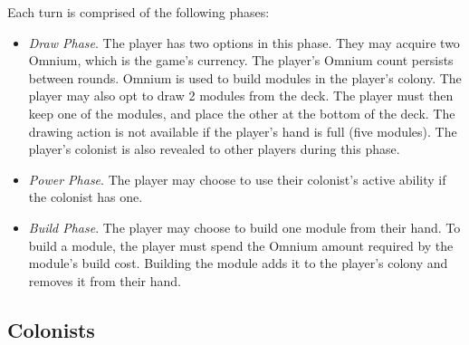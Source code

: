 Each turn is comprised of the following phases:
\begin{itemize}
    \item \emph{Draw Phase}. The player has two options in this phase.
        They may acquire two Omnium, which is the game's currency. The player's
        Omnium count persists between rounds. Omnium is used to build modules in
        the player's colony.
        The player may also opt to draw 2 modules from the deck. The player
        must then keep one of the modules, and place the other at the bottom of the deck.
        The drawing action is not available if the player's hand is full (five modules).
        The player's colonist is also revealed to other players during this phase.
    \item \emph{Power Phase}. The player may choose to use their colonist's active
        ability if the colonist has one.
    \item \emph{Build Phase}. The player may choose to build one module from their hand.
        To build a module, the player must spend the Omnium amount required by the module's
        build cost. Building the module adds it to the player's colony and removes
        it from their hand.
\end{itemize}

\clearpage
\subsection{Colonists}
\label{gamedesign:colonists}

